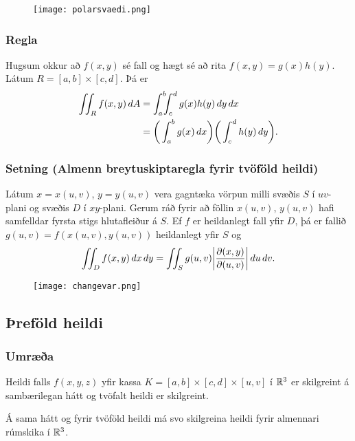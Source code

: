 \begin {figure}[h!]
 \centering
            \texttt{[image: polarsvaedi.png]}
	\caption*{}
\end {figure}



\subsubsection{Regla }
Hugsum okkur að $f(x,y)$ sé fall og hægt sé að rita
$f(x,y)=g(x)h(y)$.  Látum $R=[a,b]\times [c,d]$.  Þá er 
\begin{align*}
\int\!\!\!\int_R f(x,y)\,dA&=\int_a^b\!\!\!\int_{c}^{d}g(x)h(y)\,dy\, dx\\
&=\bigg(\int_a^b g(x)\,dx\bigg)\bigg(\int_c^d h(y)\,dy\bigg).
\end{align*}

 

\subsubsection{Setning (Almenn breytuskiptaregla fyrir tvöföld heildi)}

Látum $x=x(u,v)$, $y=y(u,v)$ vera gagntæka vörpun milli svæðis $S$ í
$uv$-plani og svæðis $D$ í $xy$-plani.  Gerum ráð fyrir að föllin  
$x(u,v)$, $y(u,v)$ hafi samfelldar fyrsta stigs hlutafleiður á $S$.  Ef
$f$ er heildanlegt fall yfir $D$, þá er fallið $g(u,v)=f(x(u,v), y(u,v))$
heildanlegt yfir $S$ og 
$$\int\!\!\!\int_D f(x,y)\,dx\,dy=\int\!\!\!\int_S g(u,v)
\bigg|\frac{\partial(x,y)}{\partial(u,v)}\bigg|\,du\,dv.$$

\begin {figure}[h!]
 \centering
            \texttt{[image: changevar.png]}
	\caption*{}
\end {figure}




\subsection{Þreföld heildi} 

\subsubsection{Umræða }
Heildi falls $f(x,y,z)$ yfir kassa $K=[a,b]\times[c,d]\times[u,v]$ í ${\mathbb R}^3$ er skilgreint á sambærilegan hátt og  tvöfalt heildi er skilgreint.  

\medskip
Á sama hátt og fyrir tvöföld heildi má svo skilgreina heildi fyrir almennari rúmskika í ${\mathbb R}^3$. 

